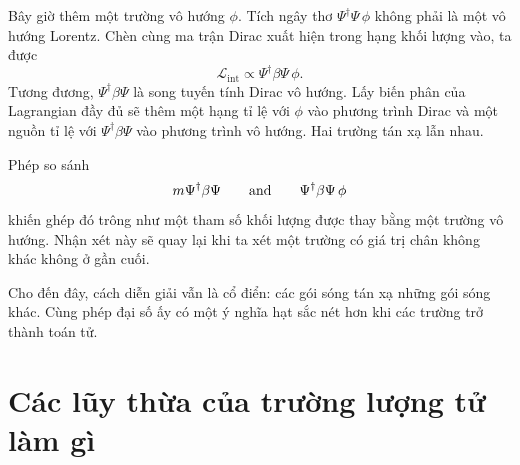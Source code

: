 \begin{classroomqa}
\end{classroomqa}

Bây giờ thêm một trường vô hướng \(\phi\). Tích ngây thơ \(\Psi^\dagger\Psi\,\phi\) không phải là một vô hướng Lorentz. Chèn cùng ma trận Dirac xuất hiện trong hạng khối lượng vào, ta được
\begin{equation}
\mathcal L_{\mathrm{int}}
\propto
\Psi^\dagger\beta\Psi\,\phi.
\end{equation}
Tương đương, \(\Psi^\dagger\beta\Psi\) là song tuyến tính Dirac vô hướng. Lấy biến phân của Lagrangian đầy đủ sẽ thêm một hạng tỉ lệ với \(\phi\) vào phương trình Dirac và một nguồn tỉ lệ với \(\Psi^\dagger\beta\Psi\) vào phương trình vô hướng. Hai trường tán xạ lẫn nhau.

\begin{classroomqa}
\end{classroomqa}

Phép so sánh
\begin{equation}
m\Psi^\dagger\beta\Psi
\qquad\hbox{and}\qquad
\Psi^\dagger\beta\Psi\,\phi
\end{equation}
khiến ghép đó trông như một tham số khối lượng được thay bằng một trường vô hướng. Nhận xét này sẽ quay lại khi ta xét một trường có giá trị chân không khác không ở gần cuối.

Cho đến đây, cách diễn giải vẫn là cổ điển: các gói sóng tán xạ những gói sóng khác. Cùng phép đại số ấy có một ý nghĩa hạt sắc nét hơn khi các trường trở thành toán tử.

\section{Các lũy thừa của trường lượng tử làm gì}

